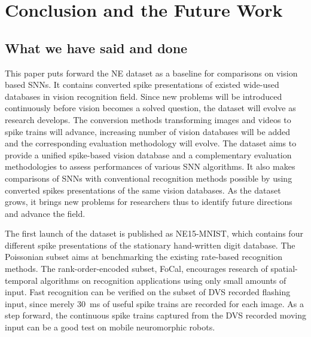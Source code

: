 \section{Conclusion and the Future Work}
\label{sec:summ}
\subsection{What we have said and done}
%
%

This paper puts forward the NE dataset as a baseline for comparisons on vision based SNNs.
It contains converted spike presentations of existed wide-used databases in vision recognition field.
Since new problems will be introduced continuously before vision becomes a solved question, the dataset will evolve as research develops. 
The conversion methods transforming images and videos to spike trains will advance, increasing number of vision databases will be added and the corresponding evaluation methodology will evolve.
The dataset aims to provide a unified spike-based vision database and a complementary evaluation methodologies to assess performances of various SNN algorithms.
It also makes comparisons of SNNs with conventional recognition methods possible by using converted spikes presentations of the same vision databases.
As the dataset grows, it brings new problems for researchers thus to identify future directions and advance the field.

The first launch of the dataset is published as NE15-MNIST, which contains four different spike presentations of the stationary hand-written digit database.
The Poissonian subset aims at benchmarking the existing rate-based recognition methods.
The rank-order-encoded subset, FoCal, encourages research of spatial-temporal algorithms on recognition applications using only small amounts of input.
Fast recognition can be verified on the subset of DVS recorded flashing input, since merely 30~ms of useful spike trains are recorded for each image.
As a step forward, the continuous spike trains captured from the DVS recorded moving input can be a good test on mobile neuromorphic robots.

